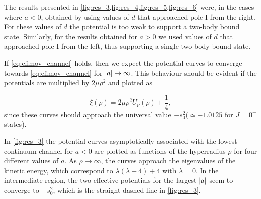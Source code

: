 The results presented in \cref{fig:res_3,fig:res_4,fig:res_5,fig:res_6} were, in the cases where $a<0$, obtained by using values of $d$ that approached pole $\mathrm{I}$ from the right. For these values of $d$ the potential is too weak to support a two-body bound state. Similarly, for the results obtained for $a>0$ we used values of $d$ that approached pole $\mathrm{I}$ from the left, thus supporting a single two-body bound state. 

If \eqref{eq:efimov_channel} holds, then we expect the potential curves to converge towards \eqref{eq:efimov_channel} for $\lvert a\rvert \rightarrow \infty$. This behaviour should be evident if the potentials are multiplied by $2 \mu \rho^2$ and plotted as 

\begin{equation}\label{eq:lambda}
\xi(\rho) = 2 \mu \rho^2 U_{\nu}(\rho) + \frac{1}{4},
\end{equation}
since these curves should approach the universal value $-s_0^2 (\simeq -1.0125$ for $J=0^+$ states).

In \cref{fig:res_3} the potential curves asymptotically associated with the lowest continuum channel for $a<0$ are plotted as functions of the hyperradius $\rho$ for four different values of $a$. As $\rho \rightarrow \infty$, the curves approach the eigenvalues of the kinetic energy, which correspond to $\lambda(\lambda + 4) + 4$ with $\lambda = 0$. In the intermediate region, the two effective potentials for the largest $\lvert a\rvert$ seem to converge to $-s_0^2$, which is the straight dashed line in \cref{fig:res_3}. 

